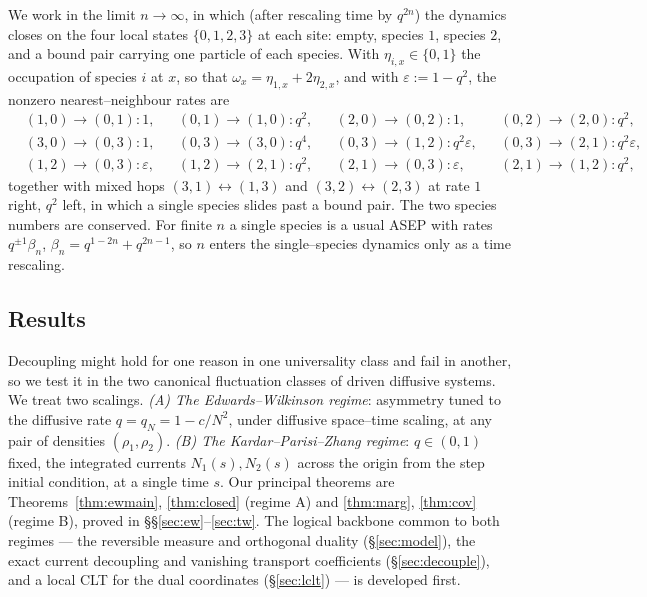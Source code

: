 \documentclass[11pt]{article}
\theoremstyle{plain}
\theoremstyle{definition}
\theoremstyle{remark}
\newcommand{\eps}{\varepsilon}\newcommand{\Exp}{\mathrm{Exp}}
\begin{document}
We work in the limit $n\to\infty$, in which (after rescaling time by $q^{2n}$) the
dynamics closes on the four local states $\{0,1,2,3\}$ at each site: empty, species
$1$, species $2$, and a bound pair carrying one particle of each species. With
$\eta_{i,x}\in\{0,1\}$ the occupation of species $i$ at $x$, so that
$\omega_x=\eta_{1,x}+2\eta_{2,x}$, and with $\eps:=1-q^2$, the nonzero
nearest--neighbour rates are
\begin{equation}\label{eq:rates}
\begin{aligned}
&(1,0)\!\to\!(0,1):1, &&(0,1)\!\to\!(1,0):q^2, &&(2,0)\!\to\!(0,2):1, &&(0,2)\!\to\!(2,0):q^2,\\
&(3,0)\!\to\!(0,3):1, &&(0,3)\!\to\!(3,0):q^4, &&(0,3)\!\to\!(1,2):q^2\eps, &&(0,3)\!\to\!(2,1):q^2\eps,\\
&(1,2)\!\to\!(0,3):\eps, &&(1,2)\!\to\!(2,1):q^2, &&(2,1)\!\to\!(0,3):\eps, &&(2,1)\!\to\!(1,2):q^2,
\end{aligned}
\end{equation}
together with mixed hops $(3,1)\!\leftrightarrow\!(1,3)$ and
$(3,2)\!\leftrightarrow\!(2,3)$ at rate $1$ right, $q^2$ left, in which a single
species slides past a bound pair. The two species numbers are conserved. For finite
$n$ a single species is a usual ASEP with rates $q^{\pm1}\beta_n$,
$\beta_n=q^{1-2n}+q^{2n-1}$, so $n$ enters the single--species dynamics only as a time
rescaling.

\subsection{Results}\label{sec:introresults}
Decoupling might hold for one reason in one universality class and fail in another, so
we test it in the two canonical fluctuation classes of driven diffusive systems. We
treat two scalings. \emph{(A) The Edwards--Wilkinson regime}: asymmetry tuned to
the diffusive rate $q=q_N=1-c/N^2$, under diffusive space--time scaling, at any pair of
densities $(\rho_1,\rho_2)$. \emph{(B) The Kardar--Parisi--Zhang
regime}: $q\in(0,1)$ fixed, the integrated currents $N_1(s),N_2(s)$ across the origin
from the step initial condition, at a single time $s$. Our principal theorems are
Theorems~\ref{thm:ewmain}, \ref{thm:closed} (regime A) and \ref{thm:marg},
\ref{thm:cov} (regime B), proved in \S\S\ref{sec:ew}--\ref{sec:tw}. The logical
backbone common to both regimes --- the reversible measure and orthogonal duality
(\S\ref{sec:model}), the exact current decoupling and vanishing transport
coefficients (\S\ref{sec:decouple}), and a local CLT for the dual coordinates
(\S\ref{sec:lclt}) --- is developed first.
\end{document}
